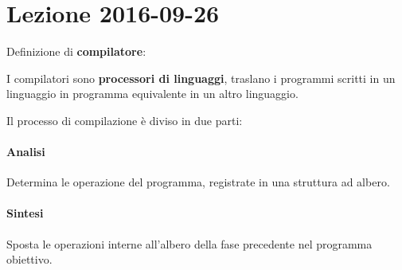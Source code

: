 \section{Lezione 2016-09-26}
Definizione di \textbf{compilatore}:

\begin{definition}
I compilatori sono \textbf{processori di linguaggi}, traslano i programmi
scritti in un linguaggio in programma equivalente in un altro linguaggio.
\end{definition}

Il processo di compilazione è diviso in due parti:
\paragraph{Analisi}
Determina le operazione del programma, registrate in una struttura ad albero.
\paragraph{Sintesi}
Sposta le operazioni interne all'albero della fase precedente nel programma
obiettivo. \\
